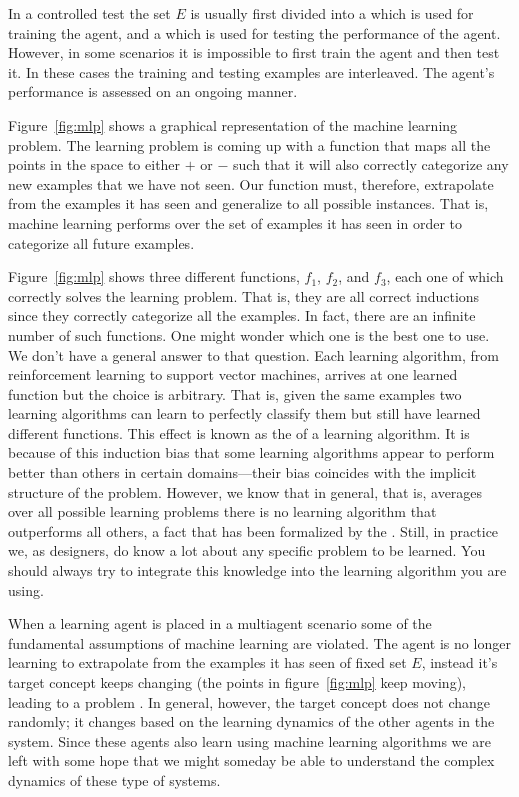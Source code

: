 In a controlled test the set $E$ is usually first divided into a
 which is used for training the agent, and a
 which is used for testing the performance of the
agent. However, in some scenarios it is impossible to first train the
agent and then test it. In these cases the training and testing
examples are interleaved. The agent's performance is assessed on an
ongoing manner.

Figure~\ref{fig:mlp} shows a graphical representation of the machine
learning problem. The learning problem is coming up with a function
that maps all the points in the space to either $+$ or $-$ such that
it will also correctly categorize any new examples that we have not
seen. Our function must, therefore, extrapolate from the examples it
has seen and generalize to all possible instances. That is, machine
learning performs  over the set of examples it has seen
in order to categorize all future examples.

Figure~\ref{fig:mlp} shows three different functions, $f_1$, $f_2$,
and $f_3$, each one of which correctly solves the learning problem.
That is, they are all correct inductions since they correctly
categorize all the examples. In fact, there are an infinite number of
such functions. One might wonder which one is the best one to use. We
don't have a general answer to that question. Each learning algorithm,
from reinforcement learning to support vector machines, arrives at one
learned function but the choice is arbitrary. That is, given the same
examples two learning algorithms can learn to perfectly classify them
but still have learned different functions. This effect is known as
the  of a learning algorithm. It is because of this
induction bias that some learning algorithms appear to perform better
than others in certain domains---their bias coincides with the
implicit structure of the problem. However, we know that in general,
that is, averages over all possible learning problems there is no
learning algorithm that outperforms all others, a fact that has been
formalized by the  \cite{wolpert95a}. Still,
in practice we, as designers, do know a lot about any specific problem
to be learned. You should always try to integrate this knowledge into
the learning algorithm you are using.

\medskip

When a learning agent is placed in a multiagent scenario some of the
fundamental assumptions of machine learning are violated. The agent is
no longer learning to extrapolate from the examples it has seen of
fixed set $E$, instead it's target concept keeps changing (the points
in figure~\ref{fig:mlp} keep moving), leading to a  problem \cite{vidal:98a}. In general, however, the target
concept does not change randomly; it changes based on the learning
dynamics of the other agents in the system. Since these agents also
learn using machine learning algorithms we are left with some hope
that we might someday be able to understand the complex dynamics of
these type of systems.

